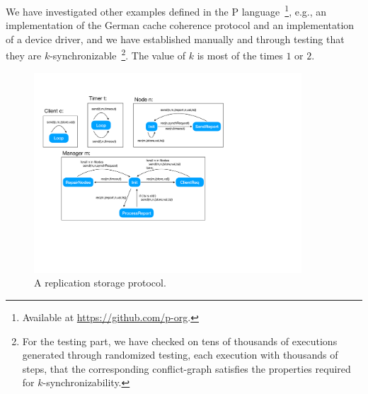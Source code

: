 We have investigated other examples defined in the P language~\footnote{Available at \url{https://github.com/p-org}.}, e.g., an implementation of the German cache coherence protocol and an implementation of a device driver, and we have established manually and through testing that they are $k$-synchronizable~\footnote{For the testing part, we have checked on tens of thousands of executions generated through randomized testing, each execution with thousands of steps, that the corresponding conflict-graph satisfies the properties required for $k$-synchronizability.}. The value of $k$ is most of the times $1$ or $2$.


%

%

\begin{figure}[t]
\includegraphics[width=10cm]{replication.pdf}
\caption{A replication storage protocol.}
\label{fig:replication}
\end{figure}

